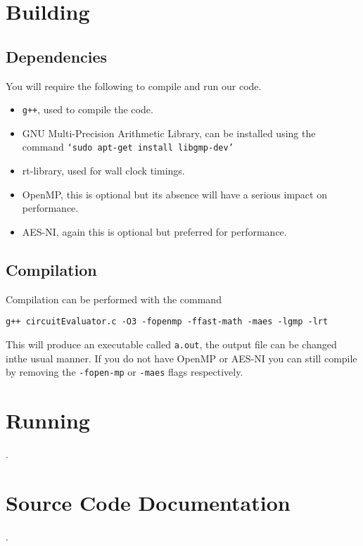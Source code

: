 \documentclass[ %
                    author={Nicholas Tutte},
                supervisor={Prof. Nigel Smart},
                    degree={MEng},
                     title={Secure Two Party Computation},
                  subtitle={A practical comparison of recent protocols},
                      type={Research - GG1K},
                      year={2015} ]{dissertation}
\begin{document}
\begin{appendices}
			\section{Building}
				\subsection{Dependencies}
					You will require the following to compile and run our code.

					\begin{itemize}
						\item \texttt{g++}, used to compile the code.
						\item GNU Multi-Precision Arithmetic Library, can be installed using the command \texttt{`sudo apt-get install libgmp-dev'}
						\item rt-library, used for wall clock timings.
						\item OpenMP, this is optional but its absence will have a serious impact on performance.
						\item AES-NI, again this is optional but preferred for performance.
					\end{itemize}

				\subsection{Compilation}
					Compilation can be performed with the command
					\begin{center}
						\texttt{g++ circuitEvaluator.c -O3 -fopenmp -ffast-math -maes -lgmp -lrt}
					\end{center}

					This will produce an executable called \texttt{a.out}, the output file can be changed inthe usual manner. If you do not have OpenMP or AES-NI you can still compile by removing the \texttt{-fopen-mp} or \texttt{-maes} flags respectively.


			\section{Running}
				.

			\section{Source Code Documentation}
				.

	\end{appendices}
\end{document}
